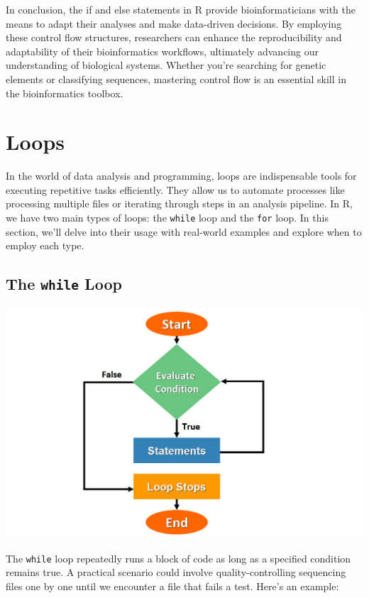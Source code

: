 \documentclass[
]{book}
\begin{document}
In conclusion, the if and else statements in R provide bioinformaticians with the means to adapt their analyses and make data-driven decisions. By employing these control flow structures, researchers can enhance the reproducibility and adaptability of their bioinformatics workflows, ultimately advancing our understanding of biological systems. Whether you're searching for genetic elements or classifying sequences, mastering control flow is an essential skill in the bioinformatics toolbox.

\hypertarget{loops}{%
\section{Loops}\label{loops}}

In the world of data analysis and programming, loops are indispensable tools for executing repetitive tasks efficiently. They allow us to automate processes like processing multiple files or iterating through steps in an analysis pipeline. In R, we have two main types of loops: the \texttt{while} loop and the \texttt{for} loop. In this section, we'll delve into their usage with real-world examples and explore when to employ each type.

\hypertarget{the-while-loop}{%
\subsection{\texorpdfstring{The \texttt{while} Loop}{The while Loop}}\label{the-while-loop}}

\includegraphics{images/while.png}

The \texttt{while} loop repeatedly runs a block of code as long as a specified condition remains true. A practical scenario could involve quality-controlling sequencing files one by one until we encounter a file that fails a test. Here's an example:
\end{document}
